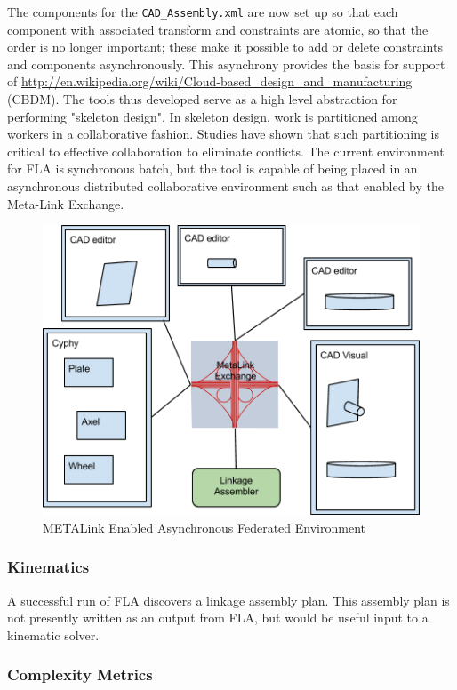 \documentclass[]{report}
\begin{document}
The components for the \texttt{CAD\_Assembly.xml} are now set up so that each component 
with associated transform and constraints are atomic, so that the order is no longer important; 
these make it possible to add or delete constraints and components asynchronously. 
This asynchrony provides the basis for support of  \url{http://en.wikipedia.org/wiki/Cloud-based_design_and_manufacturing} (CBDM).
The tools thus developed serve as a high level abstraction 
for performing "skeleton design". 
In skeleton design, work is partitioned among workers in a collaborative fashion. 
Studies have shown that such partitioning is critical to effective collaboration to eliminate conflicts.
The current environment for FLA is synchronous batch, but 
the tool is capable of being placed in an asynchronous distributed 
collaborative environment such as that enabled by the Meta-Link Exchange.

\begin{figure}[h]
\centering
\includegraphics[width=0.7\linewidth]{images/image08}
\caption[Asynchronous METALink Federation]{METALink Enabled Asynchronous Federated Environment}
\label{fig:async-metalink}
\end{figure}


\subsubsection{Kinematics}

A successful run of FLA discovers a linkage assembly plan. 
This assembly plan is not presently written as an output from FLA, 
but would be useful input to a kinematic solver.

\subsubsection{Complexity Metrics}
\end{document}
